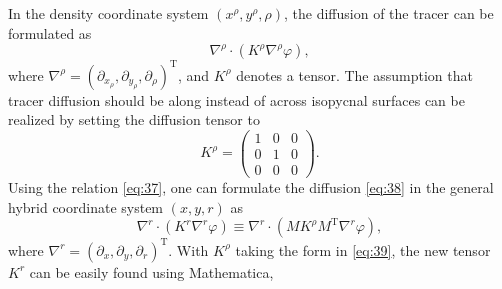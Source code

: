 \documentclass[12pt]{report}
\def\p{\partial}
\begin{document}
In the density coordinate system $(x^\rho, y^\rho, \rho)$, the
diffusion of the tracer can be formulated as
\begin{equation}
  \label{eq:38}
  \nabla^\rho\cdot(K^\rho\nabla^\rho\varphi),
\end{equation}
where $\nabla^\rho = (\p_{x_\rho}, \p_{y_\rho}, \p_\rho)^\textrm{T}$, and $K^\rho$
denotes a tensor. The assumption that tracer diffusion should be along
instead of across isopycnal surfaces can be realized by setting the
diffusion tensor to
\begin{equation}
  \label{eq:39}
  K^\rho = \left(
    \begin{matrix}
      1 & 0 & 0\\
      0 & 1 & 0\\
      0 & 0 & 0
    \end{matrix}\right).
\end{equation}
Using the relation \eqref{eq:37}, one can formulate the diffusion
\eqref{eq:38} in the general hybrid coordinate system $(x, y, r)$ as
\begin{equation}
  \label{eq:40}
  \nabla^r\cdot(K^r\nabla^r\varphi) \equiv  \nabla^r\cdot(MK^\rho
  M^\textrm{T}\nabla^r\varphi), 
\end{equation}
where $\nabla^r = (\p_x, \p_y, \p_r)^\textrm{T}$. With $K^\rho$ taking
the form in \eqref{eq:39}, the new tensor $K^r$ can be easily found
using Mathematica,
\end{document}
